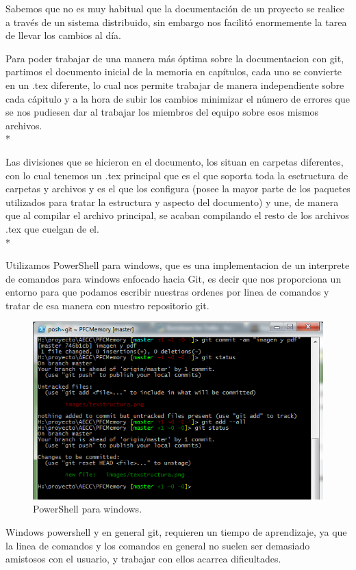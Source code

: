 \documentclass[../pfc.tex]{subfiles}
\begin{document}
	Sabemos que no es muy habitual que la documentación de un proyecto se realice a través de un sistema distribuido, sin embargo nos facilitó enormemente la tarea de llevar los cambios al día.
	
	Para poder trabajar de una manera más óptima sobre la documentacion con git, partimos el documento inicial de la memoria en capítulos, cada uno se convierte en un .tex diferente, lo cual nos permite trabajar de manera independiente sobre cada cápitulo y a la hora de subir los cambios minimizar el número de errores que se nos pudiesen dar al trabajar los miembros del equipo sobre esos mismos archivos.\\*
	
	Las divisiones que se hicieron en el documento, los situan en carpetas diferentes, con lo cual tenemos un .tex principal que es el que soporta toda la esctructura de carpetas y archivos y es el que los configura (posee la mayor parte de los paquetes utilizados para tratar la estructura y aspecto del documento) y une, de manera que al compilar el archivo principal, se acaban compilando el resto de los archivos .tex que cuelgan de el.\\*
	
	Utilizamos PowerShell para windows, que es una implementacion de un interprete de comandos para windows enfocado hacia Git, es decir que nos proporciona un entorno para que podamos escribir nuestras ordenes por linea de comandos y tratar de esa manera con nuestro repositorio git.
	
	\begin{figure}[H]
		\centering
		\includegraphics[width=0.9\linewidth]{../images/powershellcommit}
		\caption{PowerShell para windows.}
		\label{fig:powershellcommit}
	\end{figure}
	
	Windows powershell y en general git, requieren un tiempo de aprendizaje, ya que la linea de comandos y los comandos en general no suelen ser demasiado amistosos con el usuario, y trabajar con ellos acarrea dificultades.
	
\end{document}
